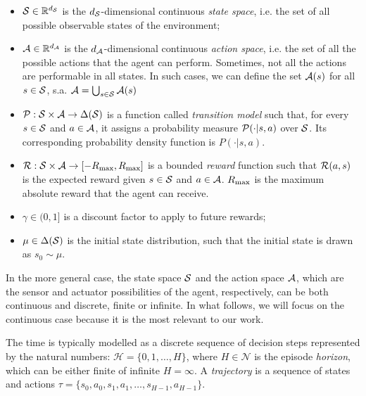\begin{itemize}
\item $\mathcal{S}\in\mathbb{R}^{d_{\mathcal{S}}}$ is the $d_{\mathcal{S}}$-dimensional continuous \emph{state space}, i.e. the set of all possible observable states of the environment;
\item $\mathcal{A}\in\mathbb{R}^{d_{\mathcal{A}}}$ is the $d_{\mathcal{A}}$-dimensional continuous \emph{action space}, i.e. the set of all the possible actions that the agent can perform. Sometimes, not all the actions are performable in all states. In such cases, we can define the set $\mathcal{A}(s)$ for all $s \in \mathcal{S}$, s.a.  $\mathcal{A} = \bigcup_{s \in \mathcal{S}} \mathcal{A}(s)$ 
\item  $\mathcal{P}:\mathcal{S}\times\mathcal{A}\to\Delta(\mathcal{S})$ is a function called \emph{transition model} such that, for every $s\in\mathcal{S}$ and $a\in\mathcal{A}$, it assigns a probability measure $\mathcal{P}(\cdot|s,a)$ over $\mathcal{S}$. Its corresponding probability density function is $P(\cdot|s,a)$.
\item $\mathcal{R}:\mathcal{S}\times\mathcal{A}\to[-R_{\max},R_{\max}]$ is a bounded \emph{reward} function such that $\mathcal{R}(a, s)$ is the expected reward given $s\in\mathcal{S}$ and $a\in\mathcal{A}$. $R_{\max}$ is the maximum absolute reward that the agent can receive.
\item $\gamma\in(0,1]$ is a discount factor to apply to future rewards;
\item $\mu\in\Delta(\mathcal{S})$ is the initial state distribution, such that the initial state is drawn as $s_0\sim\mu$.
\end{itemize}


In the more general case, the state space $\mathcal{S}$ and the action space $\mathcal{A}$, which are the sensor and actuator possibilities of the agent, respectively, can be both continuous and discrete, finite or infinite. In what follows, we will focus on the continuous case because it is the most relevant to our work.

The time is typically modelled as a discrete sequence of decision steps represented by the natural numbers: $\mathcal{H} = \{0, 1, \dots, H\}$, where $H\in\mathcal{N}$ is the episode \emph{horizon}, which can be either finite of infinite $H = \infty$. A \emph{trajectory} is a sequence of states and actions $\tau=\{s_0,a_0,s_1,a_1,\dots,s_{H-1},a_{H-1}\}$.


